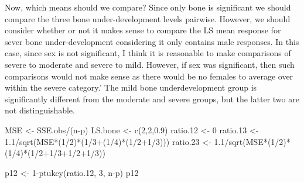 \documentclass[
]{book}
\newenvironment{Shaded}{\begin{snugshade}}{\end{snugshade}}
\newcommand{\DecValTok}[1]{\textcolor[rgb]{0.00,0.00,0.81}{#1}}
\newcommand{\FloatTok}[1]{\textcolor[rgb]{0.00,0.00,0.81}{#1}}
\newcommand{\FunctionTok}[1]{\textcolor[rgb]{0.00,0.00,0.00}{#1}}
\newcommand{\NormalTok}[1]{#1}
\newcommand{\OtherTok}[1]{\textcolor[rgb]{0.56,0.35,0.01}{#1}}
\newcommand{\SpecialCharTok}[1]{\textcolor[rgb]{0.00,0.00,0.00}{#1}}
\begin{document}
Now, which means should we compare? Since only bone is significant we should compare the three bone under-development levels pairwise. However, we should consider whether or not it makes sense to compare the LS mean response for sever bone under-development considering it only contains male responses. In this case, since sex is not significant, I think it is reasonable to make comparisons of severe to moderate and severe to mild. However, if sex was significant, then such comparisons would not make sense as there would be no females to average over within the severe category.'
The mild bone underdevelopment group is significantly different from the moderate and severe groups, but the latter two are not distinguishable.

\begin{Shaded}
\begin{Highlighting}[]
\NormalTok{MSE }\OtherTok{\textless{}{-}}\NormalTok{ SSE.obs}\SpecialCharTok{/}\NormalTok{(n}\SpecialCharTok{{-}}\NormalTok{p)}
\NormalTok{LS.bone }\OtherTok{\textless{}{-}} \FunctionTok{c}\NormalTok{(}\DecValTok{2}\NormalTok{,}\DecValTok{2}\NormalTok{,}\FloatTok{0.9}\NormalTok{)}
\NormalTok{ratio}\FloatTok{.12} \OtherTok{\textless{}{-}} \DecValTok{0}
\NormalTok{ratio}\FloatTok{.13} \OtherTok{\textless{}{-}} \FloatTok{1.1}\SpecialCharTok{/}\FunctionTok{sqrt}\NormalTok{(MSE}\SpecialCharTok{*}\NormalTok{(}\DecValTok{1}\SpecialCharTok{/}\DecValTok{2}\NormalTok{)}\SpecialCharTok{*}\NormalTok{(}\DecValTok{1}\SpecialCharTok{/}\DecValTok{3}\SpecialCharTok{+}\NormalTok{(}\DecValTok{1}\SpecialCharTok{/}\DecValTok{4}\NormalTok{)}\SpecialCharTok{*}\NormalTok{(}\DecValTok{1}\SpecialCharTok{/}\DecValTok{2}\SpecialCharTok{+}\DecValTok{1}\SpecialCharTok{/}\DecValTok{3}\NormalTok{)))}
\NormalTok{ratio}\FloatTok{.23} \OtherTok{\textless{}{-}} \FloatTok{1.1}\SpecialCharTok{/}\FunctionTok{sqrt}\NormalTok{(MSE}\SpecialCharTok{*}\NormalTok{(}\DecValTok{1}\SpecialCharTok{/}\DecValTok{2}\NormalTok{)}\SpecialCharTok{*}\NormalTok{(}\DecValTok{1}\SpecialCharTok{/}\DecValTok{4}\NormalTok{)}\SpecialCharTok{*}\NormalTok{(}\DecValTok{1}\SpecialCharTok{/}\DecValTok{2}\SpecialCharTok{+}\DecValTok{1}\SpecialCharTok{/}\DecValTok{3}\SpecialCharTok{+}\DecValTok{1}\SpecialCharTok{/}\DecValTok{2}\SpecialCharTok{+}\DecValTok{1}\SpecialCharTok{/}\DecValTok{3}\NormalTok{))}

\NormalTok{p12 }\OtherTok{\textless{}{-}} \DecValTok{1}\SpecialCharTok{{-}}\FunctionTok{ptukey}\NormalTok{(ratio}\FloatTok{.12}\NormalTok{, }\DecValTok{3}\NormalTok{, n}\SpecialCharTok{{-}}\NormalTok{p)}
\NormalTok{p12}
\end{Highlighting}
\end{Shaded}
\end{document}
